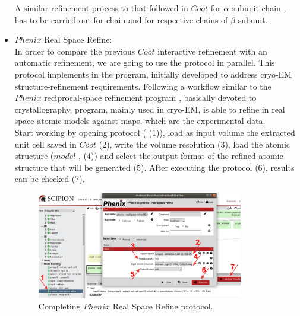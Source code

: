 \begin{itemize}
 A similar refinement process to that followed in $Coot$ for  $\alpha$ subunit chain , has to be carried out for chain  and for respective chains of  $\beta$ subunit.\\
 
 
 \item $Phenix$ Real Space Refine:\\
 
 In order to compare the previous $Coot$ interactive refinement with an automatic refinement, we are going to use the
  protocol in parallel. This protocol implements in \scipion the  program, initially developed to address cryo-EM structure-refinement requirements. Following a workflow similar to the $Phenix$ reciprocal-space refinement program , basically devoted to crystallography,  program, mainly used in cryo-EM, is able to refine in real space atomic models against maps, which are the experimental data.\\
 
 Start working by opening  protocol ( (1)), load as input volume the extracted unit cell saved in $Coot$ (2), write the volume resolution (3), load the atomic structure ($model$ , (4)) and select the output format of the refined atomic structure that will be generated (5). After executing the protocol (6), results can be checked (7). 
 
 \begin{figure}[H]
  \centering 
  \captionsetup{width=.7\linewidth} 
  \includegraphics[width=0.85\textwidth]{Images/Fig29}
  \caption{Completing $Phenix$ Real Space Refine protocol.}
  \label{fig:phenix_real_space_refine_protocol}
  \end{figure}
 

\end{itemize}
